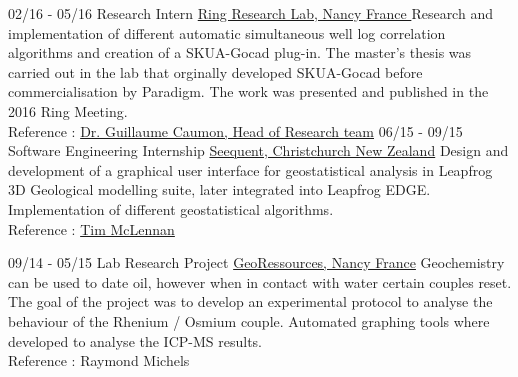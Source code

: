 \documentclass[]{friggeri-cv}
\begin{document}
    \vspace*{\fill}
    \begin{entrylist}
    \entry
    {02/16 - 05/16}
    {Research Intern}
    {\href{http://www.ring-team.org/}{Ring Research Lab, Nancy France }}
    {Research and implementation of different automatic simultaneous well log correlation algorithms and creation of a SKUA-Gocad plug-in. The master's thesis was carried out in the lab that orginally developed SKUA-Gocad before commercialisation by Paradigm. The work was presented and published in the 2016 Ring Meeting. \\Reference : \href{mailto:Guillaume.Caumon@ensg.univ-lorraine.fr}{Dr. Guillaume Caumon, Head of Research team}}
    \entry
    {06/15 - 09/15}
    {Software Engineering Internship}
    {\href{https://www.seequent.com/}{Seequent, Christchurch New Zealand}}
    {Design and development of a graphical user interface for geostatistical analysis in Leapfrog 3D Geological modelling suite, later integrated into Leapfrog EDGE. Implementation of different geostatistical algorithms.
    \\
    Reference : \href{mailto:tim.mclennan@seequent.com}{Tim McLennan}}

	\entry
	{09/14 - 05/15}
	{Lab Research Project}
	{\href{http://georessources.univ-lorraine.fr/}{GeoRessources, Nancy France}}
	{Geochemistry can be used to date oil, however when in contact with water certain couples reset. The goal of the project was to develop an experimental protocol to analyse the behaviour of the Rhenium / Osmium couple. Automated graphing tools where developed to analyse the ICP-MS results.
		\\
		Reference : Raymond Michels}
\end{entrylist}
\end{document}
